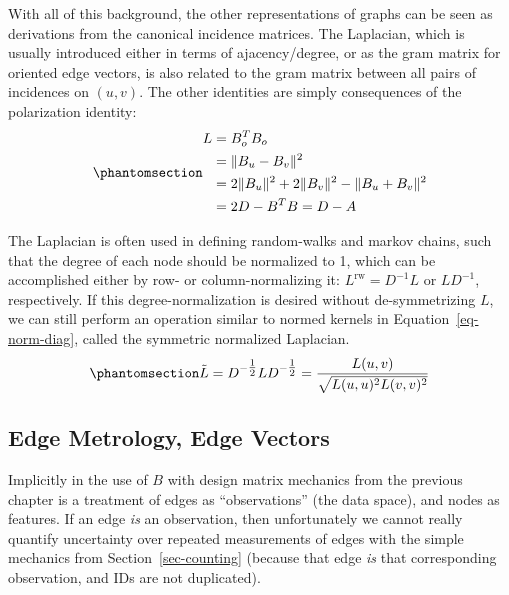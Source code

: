 \documentclass[%
	12pt,
		oneside,
		letterpaper
]{book}
\begin{document}
With all of this background, the other representations of graphs can be seen as derivations from the canonical incidence matrices.
The Laplacian, which is usually introduced either in terms of ajacency/degree, or as the gram matrix for oriented edge vectors, is also related to the gram matrix between all pairs of incidences on \((u,v)\).
The other identities are simply consequences of the polarization identity:
\begin{equation}\phantomsection\label{eq-laplacian}{
\begin{split}
L & = B_o^TB_o\\
  & = \|B_u - B_v \|^2 \\
  & = 2\|B_u\|^2 +2\|B_v\|^2 - \|B_u + B_v \|^2 \\
  & = 2D - B^TB = D-A
\end{split}
}\end{equation}

The Laplacian is often used in defining random-walks and markov chains, such that the degree of each node should be normalized to 1, which can be accomplished either by row- or column-normalizing it: \(L^{\textrm{rw}}=D^{-1}L\) or \(LD^{-1}\), respectively.
If this degree-normalization is desired without de-symmetrizing \(L\), we can still perform an operation similar to normed kernels in Equation~\ref{eq-norm-diag}, called the symmetric normalized Laplacian.
\begin{equation}\phantomsection\label{eq-norm-laplacian}{
\tilde{L} = D^{-\tfrac{1}{2}}LD^{-\tfrac{1}{2}} = \frac{L(u,v)}{\sqrt{L(u,u)^2L(v,v)^2}}
}\end{equation}

\subsection{Edge Metrology, Edge Vectors}\label{edge-metrology-edge-vectors}

Implicitly in the use of \(B\) with design matrix mechanics from the previous chapter is a treatment of edges as ``observations'' (the data space), and nodes as features.
If an edge \emph{is} an observation, then unfortunately we cannot really quantify uncertainty over repeated measurements of edges with the simple mechanics from Section~\ref{sec-counting} (because that edge \emph{is} that corresponding observation, and IDs are not duplicated).
\end{document}
